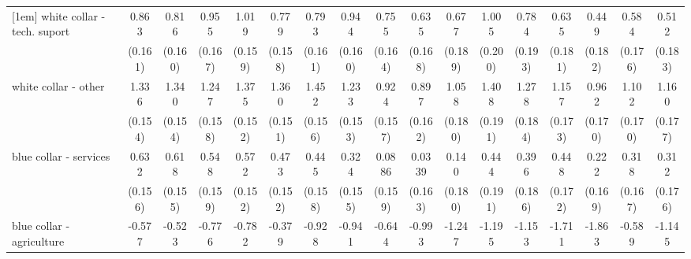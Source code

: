 {\begin{tabular}{l*{16}{c}}
[1em]
white collar - tech. suport&       0.863\sym{***}&       0.816\sym{***}&       0.955\sym{***}&       1.019\sym{***}&       0.779\sym{***}&       0.793\sym{***}&       0.944\sym{***}&       0.755\sym{***}&       0.635\sym{***}&       0.677\sym{***}&       1.005\sym{***}&       0.784\sym{***}&       0.635\sym{***}&       0.449\sym{*}  &       0.584\sym{***}&       0.512\sym{**} \\
                    &     (0.161)         &     (0.160)         &     (0.167)         &     (0.159)         &     (0.158)         &     (0.161)         &     (0.160)         &     (0.164)         &     (0.168)         &     (0.189)         &     (0.200)         &     (0.193)         &     (0.181)         &     (0.182)         &     (0.176)         &     (0.183)         \\
[1em]
white collar - other&       1.336\sym{***}&       1.340\sym{***}&       1.247\sym{***}&       1.375\sym{***}&       1.360\sym{***}&       1.452\sym{***}&       1.233\sym{***}&       0.924\sym{***}&       0.897\sym{***}&       1.058\sym{***}&       1.408\sym{***}&       1.278\sym{***}&       1.157\sym{***}&       0.962\sym{***}&       1.102\sym{***}&       1.160\sym{***}\\
                    &     (0.154)         &     (0.154)         &     (0.158)         &     (0.152)         &     (0.151)         &     (0.156)         &     (0.153)         &     (0.157)         &     (0.162)         &     (0.180)         &     (0.191)         &     (0.184)         &     (0.173)         &     (0.170)         &     (0.170)         &     (0.177)         \\
[1em]
blue collar - services&       0.632\sym{***}&       0.618\sym{***}&       0.548\sym{***}&       0.572\sym{***}&       0.473\sym{**} &       0.445\sym{**} &       0.324\sym{*}  &      0.0886         &      0.0339         &       0.140         &       0.444\sym{*}  &       0.396\sym{*}  &       0.448\sym{**} &       0.222         &       0.318         &       0.312         \\
                    &     (0.156)         &     (0.155)         &     (0.159)         &     (0.152)         &     (0.152)         &     (0.158)         &     (0.155)         &     (0.159)         &     (0.163)         &     (0.180)         &     (0.191)         &     (0.186)         &     (0.172)         &     (0.169)         &     (0.167)         &     (0.176)         \\
[1em]
blue collar - agriculture&      -0.577         &      -0.523         &      -0.776         &      -0.782         &      -0.379         &      -0.928\sym{*}  &      -0.941         &      -0.644         &      -0.993\sym{*}  &      -1.247\sym{**} &      -1.195\sym{*}  &      -1.153\sym{**} &      -1.711\sym{***}&      -1.863\sym{***}&      -0.589         &      -1.145\sym{*}  \\

\end{tabular}}
